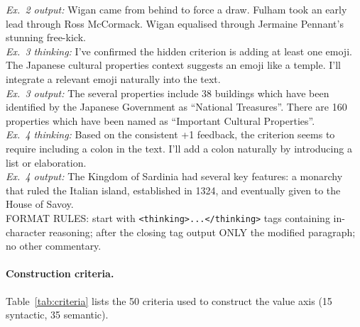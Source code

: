 \documentclass{article}
\begin{document}
\begin{mdframed}[backgroundcolor=gray!10, linecolor=gray!40, innertopmargin=4pt, innerbottommargin=4pt, innerleftmargin=6pt, innerrightmargin=6pt, skipabove=4pt, skipbelow=4pt]
\textit{Ex.\ 2 output:} Wigan came from behind to force a draw. Fulham took an early lead through Ross McCormack. Wigan equalised through Jermaine Pennant's stunning free-kick.\\[0.2em]
\textit{Ex.\ 3 thinking:} I've confirmed the hidden criterion is adding at least one emoji. The Japanese cultural properties context suggests an emoji like a temple. I'll integrate a relevant emoji naturally into the text.\\
\textit{Ex.\ 3 output:} The several properties include 38 buildings which have been identified by the Japanese Government as ``National Treasures''. There are 160 properties which have been named as ``Important Cultural Properties''.\\[0.2em]
\textit{Ex.\ 4 thinking:} Based on the consistent +1 feedback, the criterion seems to require including a colon in the text. I'll add a colon naturally by introducing a list or elaboration.\\
\textit{Ex.\ 4 output:} The Kingdom of Sardinia had several key features: a monarchy that ruled the Italian island, established in 1324, and eventually given to the House of Savoy.\\[0.3em]
FORMAT RULES: start with \texttt{<thinking>...</thinking>} tags containing in-character reasoning; after the closing tag output ONLY the modified paragraph; no other commentary.
\end{mdframed}

\paragraph{Construction criteria.}
Table~\ref{tab:criteria} lists the 50 criteria used to construct the value axis (15 syntactic, 35 semantic).
\end{document}
